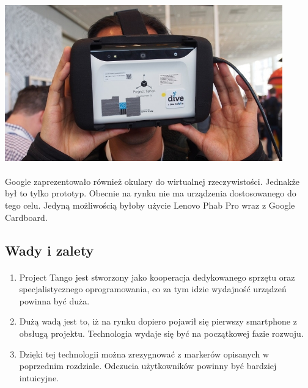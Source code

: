 \begin{center}
\includegraphics[width=0.9\textwidth]{images/tango.jpg}
\end{center}

\paragraph{}
Google zaprezentowało również okulary do wirtualnej rzeczywistości. Jednakże był to tylko prototyp. Obecnie na rynku nie ma urządzenia dostosowanego do tego celu. Jedyną możliwością byłoby użycie Lenovo Phab Pro wraz z Google Cardboard.

\subsection{Wady i zalety}
\paragraph{}
\begin{enumerate}
	\item Project Tango jest stworzony jako kooperacja dedykowanego sprzętu oraz specjalistycznego oprogramowania, co za tym idzie wydajność urządzeń powinna być duża.
	\item Dużą wadą jest to, iż na rynku dopiero pojawił się pierwszy smartphone z obsługą projektu. Technologia wydaje się być na początkowej fazie rozwoju.
	\item Dzięki tej technologii można zrezygnować z markerów opisanych w poprzednim rozdziale. Odczucia użytkowników powinny być bardziej intuicyjne.
\end{enumerate}
